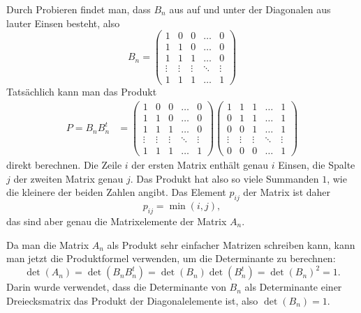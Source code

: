 \begin{loesung}
Durch Probieren findet man, dass $B_n$ aus auf und unter der Diagonalen aus
lauter Einsen besteht, also
\[
B_n
=
\begin{pmatrix}
     1&     0&     0&\dots &     0\\
     1&     1&     0&\dots &     0\\
     1&     1&     1&\dots &     0\\
\vdots&\vdots&\vdots&\ddots&\vdots\\
     1&     1&     1&\dots &     1
\end{pmatrix}
\]
Tatsächlich kann man das Produkt
\begin{align*}
P=B_nB_n^t
&=
\begin{pmatrix}
     1&     0&     0&\dots &     0\\
     1&     1&     0&\dots &     0\\
     1&     1&     1&\dots &     0\\
\vdots&\vdots&\vdots&\ddots&\vdots\\
     1&     1&     1&\dots &     1
\end{pmatrix}
\begin{pmatrix}
     1&     1&     1&\dots &     1\\
     0&     1&     1&\dots &     1\\
     0&     0&     1&\dots &     1\\
\vdots&\vdots&\vdots&\ddots&\vdots\\
     0&     0&     0&\dots &     1
\end{pmatrix}
\end{align*}
direkt berechnen.
Die Zeile $i$ der ersten Matrix enthält genau $i$ Einsen, die Spalte $j$ 
der zweiten Matrix genau $j$.
Das Produkt hat also so viele Summanden $1$, wie die kleinere der beiden
Zahlen angibt.
Das Element $p_{ij}$ der Matrix ist daher
\[
p_{ij}=\min(i,j),
\]
das sind aber genau die Matrixelemente der Matrix $A_n$.

Da man die Matrix $A_n$ als Produkt sehr einfacher Matrizen schreiben kann,
kann man jetzt die Produktformel verwenden, um die Determinante zu berechnen:
\[
\det(A_n)=\det(B_nB_n^t)=\det(B_n)\det(B_n^t)=\det(B_n)^2=1.
\]
Darin wurde verwendet, dass die Determinante von $B_n$ als Determinante
einer Dreiecksmatrix das Produkt der Diagonalelemente ist, also
$\det(B_n)=1$. 
\end{loesung}

